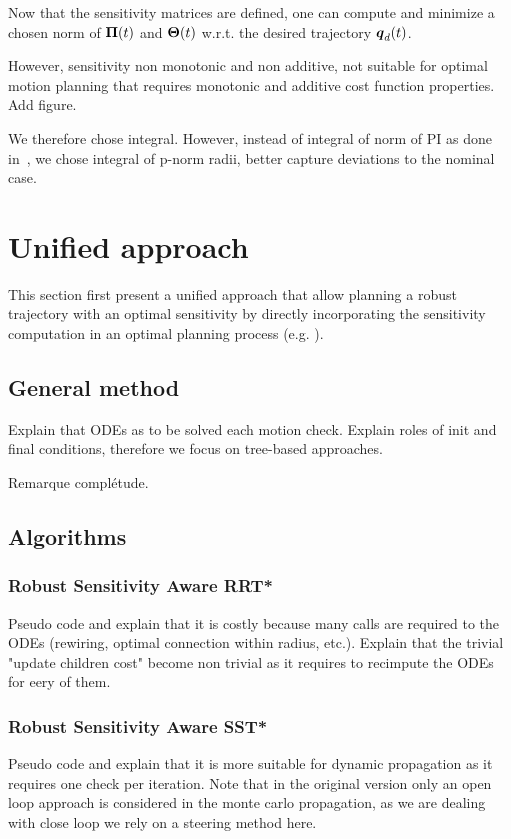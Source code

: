 Now that the sensitivity matrices are defined, one can compute and minimize a chosen norm of $\boldsymbol{\Pi}(t)$ and $\boldsymbol{\Theta}(t)$ w.r.t. the desired trajectory $\boldsymbol{q}_d(t)$.

However, sensitivity non monotonic and non additive, not suitable for optimal motion planning that requires monotonic and additive cost function properties.
Add figure.

We therefore chose integral.
However, instead of integral of norm of PI as done in~\cite{cPi,cTh}, we chose integral of p-norm radii, better capture deviations to the nominal case.

\section{Unified approach}

This section first present a unified approach that allow planning a robust trajectory with an optimal sensitivity by directly incorporating the sensitivity computation in an optimal planning process (e.g. ).

\subsection{General method}
Explain that ODEs as to be solved each motion check.
Explain roles of init and final conditions, therefore we focus on tree-based approaches.

Remarque complétude.

\subsection{Algorithms}
\subsubsection{Robust Sensitivity Aware RRT*}
Pseudo code and explain that it is costly because many calls are required to the ODEs (rewiring, optimal connection within radius, etc.).
Explain that the trivial "update children cost" become non trivial as it requires to recimpute the ODEs for eery of them.
\subsubsection{Robust Sensitivity Aware SST*}
Pseudo code and explain that it is more suitable for dynamic propagation as it requires one check per iteration.
Note that in the original version only an open loop approach is considered in the monte carlo propagation, as we are dealing with close loop we rely on a steering method here.

